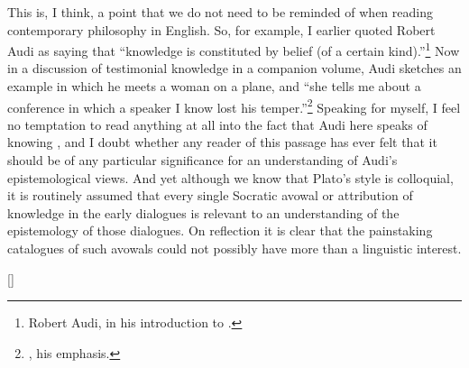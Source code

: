 \documentclass[11pt,letterpaper,oneside]{amsart} %
\begin{document}
This is, I think, a point that we do not need to be reminded of when reading contemporary philosophy in English. So, for example, I earlier quoted Robert Audi as saying that ``knowledge is constituted by belief (of a certain kind).''\footnote{Robert Audi, in his introduction to \citet[p.\ 1]{huemer2002ecr}.} Now in a discussion of testimonial knowledge in a companion volume, Audi sketches an example in which he meets a woman on a plane, and ``she tells me about a conference in which a speaker I know lost his temper.''\footnote{\citet[pp.\ 134--5]{audi2003eci}, his emphasis.} Speaking for myself, I feel no temptation to read anything at all into the fact that Audi here speaks of knowing , and I doubt whether any reader of this passage has ever felt that it should be of any particular significance for an understanding of Audi's epistemological views. And yet although we know that Plato's style is colloquial, it is routinely assumed that every single Socratic avowal or attribution of knowledge in the early dialogues is relevant to an understanding of the epistemology of those dialogues. On reflection it is clear that the painstaking catalogues of such avowals could not possibly have more than a linguistic interest.



[]

%














\end{document}
